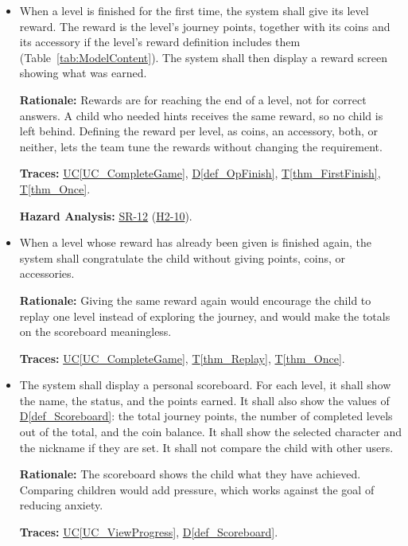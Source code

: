 \documentclass[12pt]{article}
\newcommand{\ucref}[1]{\hyperref[#1]{UC\ref*{#1}}}
\newcounter{reqnum} %
\newcommand{\thmref}[1]{\hyperref[#1]{T\ref*{#1}}}
\newcommand{\defref}[1]{\hyperref[#1]{D\ref*{#1}}}
\newcommand{\haurl}{https://team-hindsight.github.io/ophthamology-game/HazardAnalysis/HazardAnalysis.pdf}
\newcommand{\hasrref}[2]{\href{\haurl\#nameddest=sr:#1}{SR-#2}}
\newcommand{\hahazref}[2]{\href{\haurl\#nameddest=haz:#1}{H#2}}
\newcommand{\hazsr}[4]{\hasrref{#1}{#2} (\hahazref{#3}{#4})}
\begin{document}
\begin{itemize}

\item[\refstepcounter{reqnum}\textbf{FR\thereqnum}\label{FR_FirstReward}:]
When a level is finished for the first time, the system shall give its level
reward. The reward is the level's journey points, together with its coins and
its accessory if the level's reward definition includes them
(Table~\ref{tab:ModelContent}). The system shall then display a reward screen
showing what was earned.

\textbf{Rationale:} Rewards are for reaching the end of a level, not for
correct answers. A child who needed hints receives the same reward, so no
child is left behind. Defining the reward per level, as coins, an accessory,
both, or neither, lets the team tune the rewards without changing the
requirement.

\textbf{Traces:} \ucref{UC_CompleteGame}, \defref{def_OpFinish},
\thmref{thm_FirstFinish}, \thmref{thm_Once}.

\textbf{Hazard Analysis:} \hazsr{NonPunitiveFeedback}{12}{PunitiveFeedback}{2-10}.

\item[\refstepcounter{reqnum}\textbf{FR\thereqnum}\label{FR_NoDuplicateReward}:]
When a level whose reward has already been given is finished again, the system
shall congratulate the child without giving points, coins, or accessories.

\textbf{Rationale:} Giving the same reward again would encourage the child to
replay one level instead of exploring the journey, and would make the totals
on the scoreboard meaningless.

\textbf{Traces:} \ucref{UC_CompleteGame}, \thmref{thm_Replay},
\thmref{thm_Once}.

\item[\refstepcounter{reqnum}\textbf{FR\thereqnum}\label{FR_Scoreboard}:]
The system shall display a personal scoreboard. For each level, it shall show
the name, the status, and the points earned. It shall also show the values of
\defref{def_Scoreboard}: the total journey points, the number of completed
levels out of the total, and the coin balance. It shall show the selected
character and the nickname if they are set. It shall not compare the child
with other users.

\textbf{Rationale:} The scoreboard shows the child what they have achieved.
Comparing children would add pressure, which works against the goal of
reducing anxiety.

\textbf{Traces:} \ucref{UC_ViewProgress}, \defref{def_Scoreboard}.

\end{itemize}
\end{document}

